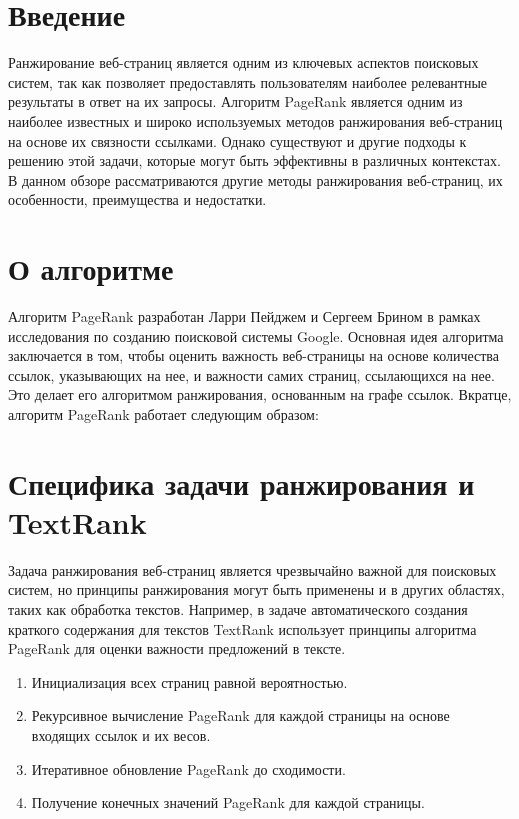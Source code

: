 \documentclass[a4paper]{article}
\begin{document}
	\thispagestyle{empty}
	
	
		
	\newpage
		
	\tableofcontents
	
	\pagestyle{plain}
	
	\newpage
	
	\section{Введение}
		Ранжирование веб-страниц является одним из ключевых аспектов поисковых систем, так как позволяет предоставлять пользователям наиболее релевантные результаты в ответ на их запросы. Алгоритм PageRank является одним из наиболее известных и широко используемых методов ранжирования веб-страниц на основе их связности ссылками. Однако существуют и другие подходы к решению этой задачи, которые могут быть эффективны в различных контекстах. В данном обзоре рассматриваются другие методы ранжирования веб-страниц, их особенности, преимущества и недостатки.
	\section{О алгоритме}
		Алгоритм PageRank разработан Ларри Пейджем и Сергеем Брином в рамках исследования по созданию поисковой системы Google. Основная идея алгоритма заключается в том, чтобы оценить важность веб-страницы на основе количества ссылок, указывающих на нее, и важности самих страниц, ссылающихся на нее. Это делает его алгоритмом ранжирования, основанным на графе ссылок. Вкратце, алгоритм PageRank работает следующим образом:
	\section{Специфика задачи ранжирования и TextRank}
		Задача ранжирования веб-страниц является чрезвычайно важной для поисковых систем, но принципы ранжирования могут быть применены и в других областях, таких как обработка текстов. Например, в задаче автоматического создания краткого содержания для текстов TextRank использует принципы алгоритма PageRank для оценки важности предложений в тексте.

		\begin{enumerate}
			\item Инициализация всех страниц равной вероятностью.
			\item Рекурсивное вычисление PageRank для каждой страницы на основе входящих ссылок и их весов.
			\item Итеративное обновление PageRank до сходимости.
			\item Получение конечных значений PageRank для каждой страницы.
		\end{enumerate}
\end{document}
